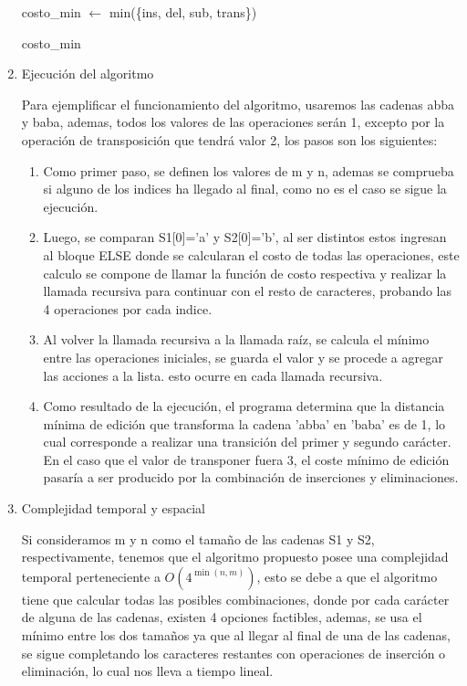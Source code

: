 \begin{enumerate}[1)]
\begin{algorithm}[H]
{        costo\_min $\leftarrow$ min(\{ins, del, sub, trans\})\;
    
        \Return costo\_min\;
    }


\end{algorithm}

\item Ejecución del algoritmo

Para ejemplificar el funcionamiento del algoritmo, usaremos las cadenas
abba y baba, ademas, todos los valores de las operaciones serán 1, excepto
por la operación de transposición que tendrá valor 2, los pasos son los siguientes:


\begin{enumerate}[1)]
    \item Como primer paso, se definen los valores de m y n, ademas se comprueba si alguno de los 
indices ha llegado al final, como no es el caso se sigue la ejecución.

\item Luego, se comparan S1[0]='a' y S2[0]='b', al ser distintos estos ingresan al bloque ELSE 
donde se calcularan el costo de todas las operaciones, este calculo se compone de llamar la función de costo 
respectiva y realizar la llamada recursiva para continuar con el resto de caracteres, 
probando las 4 operaciones por cada indice.

\item Al volver la llamada recursiva a la llamada raíz, se calcula el mínimo
entre las operaciones iniciales, se guarda el valor y se procede a agregar las
acciones a la lista. esto ocurre en cada llamada recursiva.

\item Como resultado de la ejecución, el programa determina que la distancia mínima de edición
que transforma la cadena 'abba' en 'baba' es de 1, lo cual corresponde a realizar una
transición del primer y segundo carácter. En el caso que el valor de transponer fuera 3, el coste mínimo de edición
pasaría a ser producido por la combinación de inserciones y eliminaciones.


\end{enumerate}

\item Complejidad temporal y espacial

Si consideramos m y n como el tamaño de las cadenas S1 y S2, 
respectivamente, tenemos que
el algoritmo propuesto posee una complejidad temporal 
perteneciente a $O\left(4^{\min(n, m)}\right)$, esto
se debe a que el algoritmo tiene que calcular todas las posibles
combinaciones, donde por cada carácter de alguna de las cadenas, existen
4 opciones factibles, ademas, se usa el mínimo entre los dos tamaños ya que
al llegar al final de una de las cadenas, se sigue completando los caracteres
restantes con operaciones de inserción o eliminación, 
lo cual nos lleva a tiempo lineal.


\end{enumerate}
